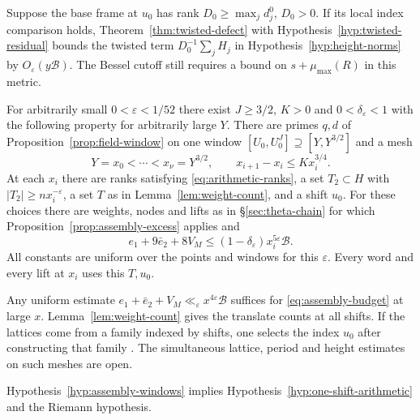 Suppose the base frame at $u_0$ has rank $D_0\ge\max_j d_j^0$,
$D_0>0$. If its local index comparison holds, Theorem~\ref{thm:twisted-defect}
with Hypothesis~\ref{hyp:twisted-residual} bounds the twisted term
$D_0^{-1}\sum_j H_j$ in Hypothesis~\ref{hyp:height-norms} by
$O_\varepsilon(y\mathcal B)$. The Bessel cutoff still requires a
bound on $s+\mu_{\max}(R)$ in this metric.

\begin{hypothesis}[\openinput]\label{hyp:assembly-windows}
For arbitrarily small $0<\varepsilon<1/52$ there exist
$J\ge3/2$, $K>0$ and $0<\delta_\varepsilon<1$ with the following
property for arbitrarily large $Y$. There are primes $q,d$ of Proposition~\ref{prop:field-window}
on one window $[U_0,U_0^J]\supseteq[Y,Y^{3/2}]$ and a mesh
\[
 Y=x_0<\cdots<x_\nu=Y^{3/2},\qquad
          x_{i+1}-x_i\le Kx_i^{3/4}.
\]
At each $x_i$ there are ranks satisfying \eqref{eq:arithmetic-ranks},
a set $T_2\subset H$ with $|T_2|\ge n x_i^{-\varepsilon}$,
a set $T$ as in Lemma~\ref{lem:weight-count}, and a shift $u_0$.
For these choices there are weights, nodes and lifts as in
\S\ref{sec:theta-chain} for which
Proposition~\ref{prop:assembly-excess} applies and
\begin{equation}\label{eq:assembly-budget}
 e_1+9\bar e_2+8V_M
       \le (1-\delta_\varepsilon)x_i^{5\varepsilon}\mathcal B .
\end{equation}
All constants are uniform over the points and windows for this
$\varepsilon$. Every word and every lift at $x_i$ uses this $T,u_0$.
\end{hypothesis}

Any uniform estimate $e_1+\bar e_2+V_M\ll_\varepsilon
x^{4\varepsilon}\mathcal B$ suffices for \eqref{eq:assembly-budget}
at large $x$. Lemma~\ref{lem:weight-count} gives the translate counts at all shifts.
If the lattices come from a family indexed by shifts, one selects
the index $u_0$ after constructing that family
\citep[\S18.7]{adriazola-grh}. The simultaneous lattice, period
and height estimates on such meshes are open.

\begin{theorem}\label{thm:assembly-rh}
Hypothesis~\ref{hyp:assembly-windows} implies
Hypothesis~\ref{hyp:one-shift-arithmetic} and the Riemann hypothesis.
\end{theorem}

